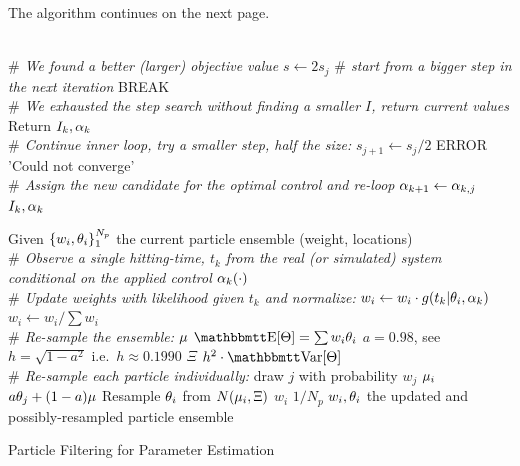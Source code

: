 \documentclass{article}
\begin{document}
The algorithm continues on the next page.  
\begin{algorithm}                     
\begin{algorithmic} [1]              
		\\ {\itshape $\#$ We found a better (larger) objective value}
		\State $s \gets 2 s_j$ {\itshape $\#$ start from a bigger step in the
		next iteration}
		\State BREAK
		\EndIf
		\\ {\itshape $\#$ We exhausted the step search without finding a 
		smaller $I$, return current values}
		\State Return $I_k, {\alpha}_k$
	\EndIf
 	\\ {\itshape  $ \#$ Continue inner loop, try a smaller step, half the size:}
	 	\State $s_{j+1}  \gets  s_j / 2$
		\State ERROR 'Could not converge'
	\EndIf
    \\{\itshape $\#$ Assign the new candidate for the optimal control and
    re-loop}
		\State ${\alpha}_{k+1} \gets {\alpha}_{k,j}$
\State \Return $I_k, {\alpha}_k$
\end{algorithmic}
\end{algorithm}




\begin{algorithm}
\begin{algorithmic}
\State Given  $\{w_i, {\theta}_i\}_1^{N_p}$ the current particle ensemble (weight,
locations)  
\\ {\itshape $\#$ Observe a single hitting-time, $t_k$ from the real (or
simulated) system conditional on the applied control ${\alpha}_k(\cdot)$}
\\ {\itshape $\#$ Update weights with likelihood given $t_k$ and normalize:}
\State $w_{i } \gets w_{i }\cdot g(t_k| {\theta}_i, {\alpha}_k)$
\State $w_{i } \gets w_{i }/ \sum w_i$
\\ {\itshape $\#$ Re-sample the ensemble:}
\State ${\mu }$ \gets $\Exp[\Th] = \sum w_i \th_i$ 
\State $a = 0.98$, see
\cite{Granade2012,Liu2001} 
\State $h = \sqrt{1-a^2}$ i.e.\ $h \approx 0.1990$
\State $\Xi$ \gets $h^2\cdot \Var[\Th]$
	\\ {\itshape $\#$ Re-sample each particle individually:}
	\State draw $j$ with probability $w_j$ 
	\State ${\mu }_i$ \gets  $a {\theta}_j + (1-a) {\mu }$
	\State Resample ${\theta}_i$ from $N({\mu }_i, \Xi)$
	\State $w_i$ \gets $1/N_p$ 
\State \Return $w_i, {\theta}_i$ the updated and possibly-resampled particle
ensemble
\end{algorithmic}
\caption{Particle Filtering for Parameter Estimation}
\label{alg:particle_resampling}
\end{algorithm}
\end{document}
